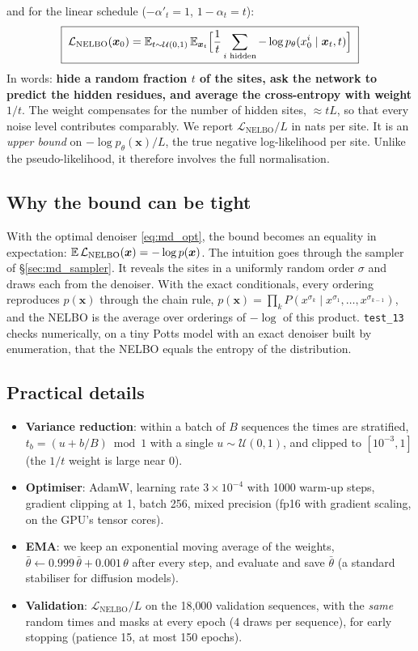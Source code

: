 and for the linear schedule ($-\alpha'_t=1$, $1-\alpha_t=t$):
\begin{equation}\label{eq:md_nelbo_lin}
\boxed{\;\mathcal L_{\text{NELBO}}(\bm x_0)=\mathbb{E}_{t\sim\mathcal U(0,1)}\,\mathbb{E}_{\bm x_t}\Big[\frac1t\sum_{i\text{ hidden}}-\log p_\theta(x^i_0\mid\bm x_t,t)\Big]\;}
\end{equation}
In words: \textbf{hide a random fraction $t$ of the sites, ask the network to predict the hidden residues, and
average the cross-entropy with weight $1/t$}. The weight compensates for the number of hidden sites, $\approx tL$,
so that every noise level contributes comparably. We report $\mathcal L_{\text{NELBO}}/L$ in nats per site. It is an
\emph{upper bound} on $-\log p_\theta(\bm x)/L$, the true negative log-likelihood per site. Unlike the pseudo-likelihood,
it therefore involves the full normalisation.

\subsection{Why the bound can be tight}
With the optimal denoiser \eqref{eq:md_opt}, the bound becomes an equality in expectation:
$\mathbb{E}\,\mathcal L_{\text{NELBO}}(\bm x)=-\log p(\bm x)$. The intuition goes through the sampler of \S\ref{sec:md_sampler}. It
reveals the sites in a uniformly random order $\sigma$ and draws each from the denoiser. With the exact conditionals,
every ordering reproduces $p(\bm x)$ through the chain rule,
$p(\bm x)=\prod_kP(x^{\sigma_k}\mid x^{\sigma_1},\dots,x^{\sigma_{k-1}})$, and the NELBO is the average over orderings of
$-\log$ of this product. \texttt{test\_13} checks numerically, on a tiny Potts model with an exact denoiser built by
enumeration, that the NELBO equals the entropy of the distribution.

\subsection{Practical details}
\begin{itemize}[nosep]
\item \textbf{Variance reduction}: within a batch of $B$ sequences the times are stratified, $t_b=(u+b/B)\bmod1$ with a
      single $u\sim\mathcal U(0,1)$, and clipped to $[10^{-3},1]$ (the $1/t$ weight is large near 0).
\item \textbf{Optimiser}: AdamW, learning rate $3\times10^{-4}$ with 1000 warm-up steps, gradient clipping at 1, batch 256,
      mixed precision (fp16 with gradient scaling, on the GPU's tensor cores).
\item \textbf{EMA}: we keep an exponential moving average of the weights, $\bar\theta\leftarrow0.999\,\bar\theta+0.001\,\theta$ after
      every step, and evaluate and save $\bar\theta$ (a standard stabiliser for diffusion models).
\item \textbf{Validation}: $\mathcal L_{\text{NELBO}}/L$ on the 18{,}000 validation sequences, with the \emph{same} random times and
      masks at every epoch (4 draws per sequence), for early stopping (patience 15, at most 150 epochs).
\end{itemize}

